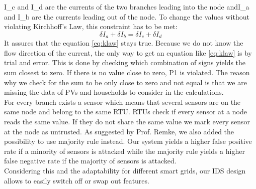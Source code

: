 		I_c and I_d are the currents of the two branches leading into the node andI_a and I_b are the currents leading out of the node.
		To change the values without violating Kirchhoff's Law, this constraint has to be met:
		\begin{equation}
		\delta I_a + \delta I_b = \delta I_c + \delta I_d
		\end{equation}
		It assures that the equation \ref{eq:klaw} stays true. Because we do not know the flow direction of the current, the only way to get an equation like \ref{eq:klaw} is by trial and error. This is done by checking which combination of signs yields the sum closest to zero. If there is no value close to zero, P1 is violated. The reason why we check for the sum to be only close to zero and not equal is that we are missing the data of PVs and households to consider in the calculations. \\
		For every branch exists a sensor which means that several sensors are on the same node and belong to the same RTU. RTUs check if every sensor at a node reads the same value. If they do not share the same value we mark every sensor at the node as untrusted. As suggested by Prof. Remke, we also added the possibility to use majority rule instead. Our system yields a higher false positive rate if a minority of sensors is attacked while the majority rule yields a higher false negative rate if the majority of sensors is attacked. \\
		Considering this and the adaptability for different smart grids, our IDS design allows to easily switch off or swap out features.